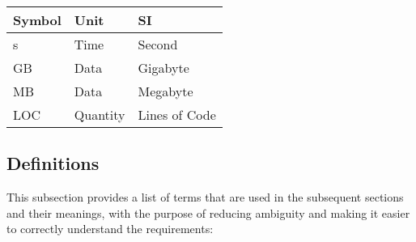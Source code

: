 \documentclass[12pt, titlepage]{article}
\begin{document}
\renewcommand{\arraystretch}{1.2}
\noindent \begin{tabular}{l l l} 
    \toprule		
    \textbf{Symbol} & \textbf{Unit} & \textbf{SI}\\
    \midrule 
    \si{\second} & Time & Second\\
    \si{GB} & Data & Gigabyte\\
    \si{MB} & Data & Megabyte\\
    \si{LOC} & Quantity & Lines of Code\\
    \bottomrule
\end{tabular}

\subsection{Definitions}
This subsection provides a list of terms that are used in the subsequent sections and their meanings, with the purpose of reducing ambiguity and making it easier to correctly understand the requirements:
\end{document}
